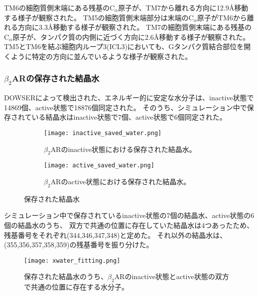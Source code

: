 \newpage

TM6の細胞質側末端にある残基の$\mathrm{C}_\alpha$原子が、TM7から離れる方向に12.9Å移動する様子が観察された。
TM5の細胞質側末端部分は末端の$\mathrm{C}_\alpha$原子がTM6から離れる方向に3.3Å移動する様子が観察された。
TM7の細胞質側末端にある残基の$\mathrm{C}_\alpha$原子が、タンパク質の内側に近づく方向に2.6Å移動する様子が観察された。
TM5とTM6を結ぶ細胞内ループ3(ICL3)においても、Gタンパク質結合部位を開くように特定の方向に並んでいるような様子が観察された。


\subsubsection{$\beta_2$ARの保存された結晶水}
DOWSERによって検出された、エネルギー的に安定な水分子は、inactive状態で14869個、active状態で18876個同定された。
そのうち、シミュレーション中で保存されている結晶水はinactive状態で7個、active状態で6個同定された。

\begin{figure}[htbp]
    \centering
    \begin{subfigure}{0.48\textwidth} %
      \centering
      \texttt{[image: inactive\_saved\_water.png]}
      \caption{$\beta_2$ARのinactive状態における保存された結晶水。}
      \label{fig:inactive_water}
    \end{subfigure}
    \hspace{0.02\textwidth} %
    \begin{subfigure}{0.48\textwidth}
      \centering
      \texttt{[image: active\_saved\_water.png]}
      \caption{$\beta_2$ARのactive状態における保存された結晶水。}
      \label{fig:active_water}
    \end{subfigure}
    \caption{保存された結晶水}
    \label{fig:water-all}
  \end{figure}

\newpage

シミュレーション中で保存されているinactive状態の7個の結晶水、active状態の6個の結晶水のうち、
双方で共通の位置に存在していた結晶水は4つあったため、残基番号をそれぞれ(344,346,347,348)と定めた。
それ以外の結晶水は、(355,356,357,358,359)の残基番号を振り分けた。

\begin{figure}[htbp]
  \centering
  \texttt{[image: xwater\_fitting.png]}
  \caption{保存された結晶水のうち、$\beta_2$ARのinactive状態とactive状態の双方で共通の位置に存在する水分子。}
  \label{fig:xwater_fitting}
\end{figure}

